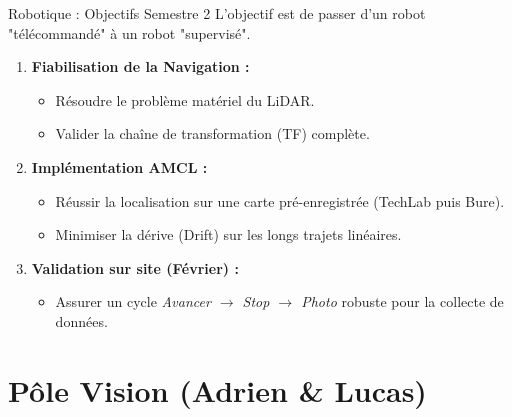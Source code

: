 \documentclass[aspectratio=169]{beamer}
\begin{document}
\begin{frame}{Robotique : Objectifs Semestre 2}
    L'objectif est de passer d'un robot "télécommandé" à un robot "supervisé".

    \begin{enumerate}
        \item \textbf{Fiabilisation de la Navigation :}
        \begin{itemize}
            \item Résoudre le problème matériel du LiDAR.
            \item Valider la chaîne de transformation (TF) complète.
        \end{itemize}
        
        \item \textbf{Implémentation AMCL :}
        \begin{itemize}
            \item Réussir la localisation sur une carte pré-enregistrée (TechLab puis Bure).
            \item Minimiser la dérive (Drift) sur les longs trajets linéaires.
        \end{itemize}

        \item \textbf{Validation sur site (Février) :}
        \begin{itemize}
            \item Assurer un cycle \textit{Avancer $\rightarrow$ Stop $\rightarrow$ Photo} robuste pour la collecte de données.
        \end{itemize}
    \end{enumerate}
\end{frame}

\section{Pôle Vision (Adrien \& Lucas)}
\end{document}
